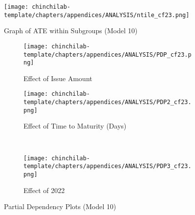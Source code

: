 \begin{figure}[h!]
    \centering
    \texttt{[image: chinchilab-template/chapters/appendices/ANALYSIS/ntile\_cf23.png]}
    \caption{Graph of ATE within Subgroups (Model 10)}
    \label{fig:my_label}
\end{figure}

\begin{figure}[H]
\centering
   \begin{subfigure}[b]{0.45\textwidth}
    \texttt{[image: chinchilab-template/chapters/appendices/ANALYSIS/PDP\_cf23.png]}
    \caption{Effect of Issue Amount}
   \label{fig:Ng1} 
\end{subfigure}
\begin{subfigure}[b]{0.45\textwidth}
    \texttt{[image: chinchilab-template/chapters/appendices/ANALYSIS/PDP2\_cf23.png]}
    \caption{Effect of Time to Maturity (Days)}
   \label{fig:Ng2}
\end{subfigure}
\\
\begin{subfigure}[b]{0.45\textwidth}
    \texttt{[image: chinchilab-template/chapters/appendices/ANALYSIS/PDP3\_cf23.png]}
    \caption{Effect of 2022}
   \label{fig:Ng2}
\end{subfigure}
\caption{Partial Dependency Plots (Model 10)}
\end{figure}


